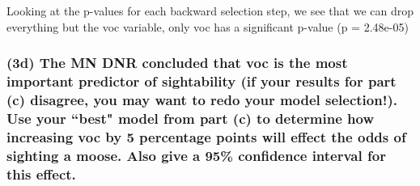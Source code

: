 \documentclass[
]{article}
\begin{document}
Looking at the p-values for each backward selection step, we see that we
can drop everything but the voc variable, only voc has a significant
p-value (p = 2.48e-05)

\hypertarget{d-the-mn-dnr-concluded-that-voc-is-the-most-important-predictor-of-sightability-if-your-results-for-part-c-disagree-you-may-want-to-redo-your-model-selection.-use-your-best-model-from-part-c-to-determine-how-increasing-voc-by-5-percentage-points-will-effect-the-odds-of-sighting-a-moose.-also-give-a-95-confidence-interval-for-this-effect.}{%
\subsubsection{(3d) The MN DNR concluded that voc is the most important
predictor of sightability (if your results for part (c) disagree, you
may want to redo your model selection!). Use your ``best" model from
part (c) to determine how increasing voc by 5 percentage points will
effect the odds of sighting a moose. Also give a 95\% confidence
interval for this
effect.}\label{d-the-mn-dnr-concluded-that-voc-is-the-most-important-predictor-of-sightability-if-your-results-for-part-c-disagree-you-may-want-to-redo-your-model-selection.-use-your-best-model-from-part-c-to-determine-how-increasing-voc-by-5-percentage-points-will-effect-the-odds-of-sighting-a-moose.-also-give-a-95-confidence-interval-for-this-effect.}}
\end{document}

